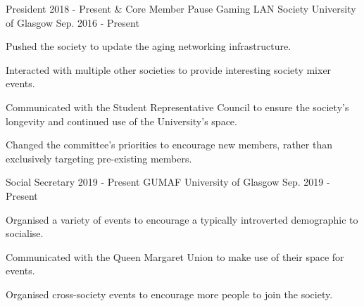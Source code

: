 

\begin{cventries}

  \cventry
    {President 2018 - Present \& Core Member} %
    {Pause Gaming LAN Society} %
    {University of Glasgow} %
    {Sep. 2016 - Present} %
    {
      \begin{cvitems} %
        \item Pushed the society to update the aging networking infrastructure.
        \item Interacted with multiple other societies to provide interesting society mixer events.
	\item Communicated with the Student Representative Council to ensure the society's longevity and continued use of the University's space.
	\item Changed the committee's priorities to encourage new members, rather than exclusively targeting pre-existing members.
      \end{cvitems}
    }
  \cventry
    {Social Secretary 2019 - Present}
    {GUMAF}
    {University of Glasgow}
    {Sep. 2019 - Present}
    {
      \begin{cvitems}
        \item Organised a variety of events to encourage a typically introverted demographic to socialise.
	\item Communicated with the Queen Margaret Union to make use of their space for events.
	\item Organised cross-society events to encourage more people to join the society.
      \end{cvitems}
    }

\end{cventries}
